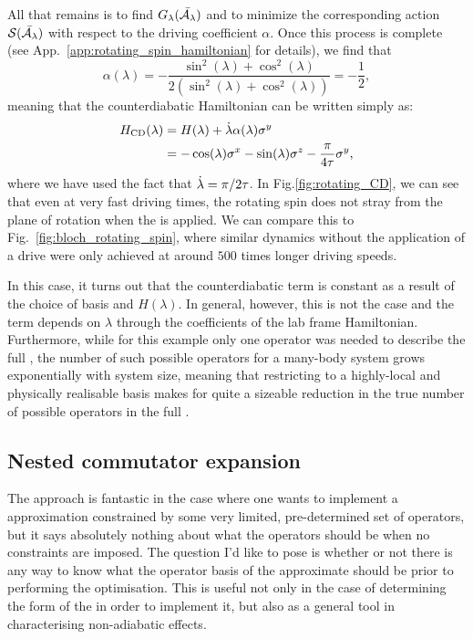     All that remains is to find $G_{\lambda}(\Bar{\mathcal{A}_{\lambda}})$ and to minimize the corresponding action $\mathcal{S}(\Bar{\mathcal{A}_{\lambda}})$ with respect to the driving coefficient $\alpha$. Once this process is complete (see App.~\ref{app:rotating_spin_hamiltonian} for details), we find that
    \begin{equation}\label{eq:rotating_spin_alpha}
        \alpha(\lambda) = -\frac{\sin^2(\lambda) + \cos^2(\lambda)}{2(\sin^2(\lambda) + \cos^2(\lambda))} = - \frac{1}{2},
    \end{equation}
    meaning that the counterdiabatic Hamiltonian can be written simply as:
    \begin{equation}\label{eq:rotating_spin_HCD}
        \begin{aligned}
            H_{\rm CD}(\lambda) &= H(\lambda) + \dot{\lambda} \alpha(\lambda) \sigma^y \\
            &= -\cos(\lambda)\sigma^x - \sin(\lambda)\sigma^z - \frac{\pi}{4 \tau} \sigma^y,
        \end{aligned}
    \end{equation}
    where we have used the fact that $\dot{\lambda} = \pi/2\tau$. In Fig.\ref{fig:rotating_CD}, we can see that even at very fast driving times, the rotating spin does not stray from the plane of rotation when the  is applied. We can compare this to Fig.~\ref{fig:bloch_rotating_spin}, where similar dynamics without the application of a  drive were only achieved at around $500$ times longer driving speeds.
    
    In this case, it turns out that the counterdiabatic term is constant as a result of the choice of basis and $H(\lambda)$. In general, however, this is not the case and the  term depends on $\lambda$ through the coefficients of the lab frame Hamiltonian. Furthermore, while for this example only one operator was needed to describe the full , the number of such possible operators for a many-body system grows exponentially with system size, meaning that restricting to a highly-local and physically realisable basis makes for quite a sizeable reduction in the true number of possible operators in the full .
    
    \subsection{Nested commutator expansion}\label{sec:2.4.2_nested_commutators}

    The  approach is fantastic in the case where one wants to implement a  approximation constrained by some very limited, pre-determined set of operators, but it says absolutely nothing about what the operators should be when no constraints are imposed. The question I'd like to pose is whether or not there is any way to know what the operator basis of the approximate  should be prior to performing the optimisation. This is useful not only in the case of determining the form of the  in order to implement it, but also as a general tool in characterising non-adiabatic effects.

